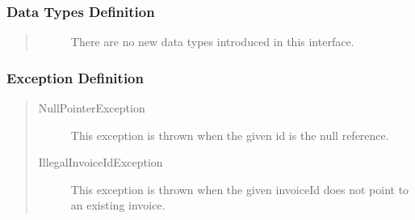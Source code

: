 \subsubsection{Data Types Definition}

\begin{quote}
	\begin{description}
		\item[]There are no new data types introduced in this interface. 
	\end{description} 
\end{quote}

\subsubsection{Exception Definition} 

\begin{quote}
	\begin{description}
		\item[NullPointerException] This exception is thrown when the given id is the
		null reference.
		\item[IllegalInvoiceIdException] This exception is thrown when the given
		invoiceId does not point to an existing invoice.
	\end{description} 
\end{quote}